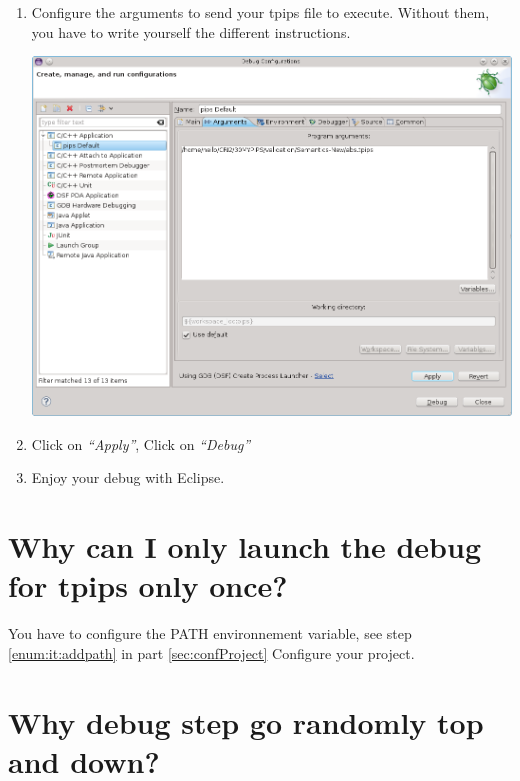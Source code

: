 \documentclass[a4paper]{article}
\begin{document}
\begin{enumerate}
\item Configure the arguments to send your tpips file to execute. 
Without them, you have to write yourself the different instructions.
\begin{center}
\noindent
\includegraphics[scale=0.4]{eclipse/07-eclipseJUNO-debug5.png}
\end{center}

\item Click on \emph{``Apply''}, Click on \emph{``Debug''}

\item Enjoy your debug with Eclipse.

\end{enumerate}


\section{Why can I only launch the debug for tpips only once?}

You have to configure the PATH environnement variable, see step \ref{enum:it:addpath} in part \ref{sec:confProject} Configure your project.

% 
% 


\section{Why debug step go randomly top and down?}
\end{document}
